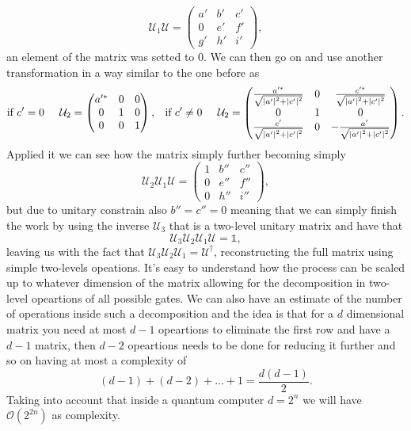 {\begin{equation}
        \mathcal{U}_1\mathcal{U} = \begin{pmatrix}
            a' & b' & c'\\
            0 & e' & f'\\
            g' & h' & i'
        \end{pmatrix},
    \end{equation}
    an element of the matrix was setted to $0$. We can then go on and use another transformation in a way similar to the one before as
    \begin{align}
        &\text{if }c'=0 \hspace{0.5cm}\mathcal{U}_2 = \begin{pmatrix}
            a'^* & 0 & 0\\
            0 & 1 & 0\\
            0 & 0 & 1
        \end{pmatrix}, &\text{if }c'\neq 0 \hspace{0.5cm}\mathcal{U}_2 =\begin{pmatrix}
            \frac{a'^*}{\sqrt{\abs{a'}^2 + \abs{c'}^2}} & 0 & \frac{c'^*}{\sqrt{\abs{a'}^2 + \abs{c'}^2}}\\
            0 & 1 & 0\\
            \frac{c'}{\sqrt{\abs{a'}^2 + \abs{c'}^2}} & 0 & -\frac{a'}{\sqrt{\abs{a'}^2 + \abs{c'}^2}}
        \end{pmatrix}.
    \end{align}
    Applied it we can see how the matrix simply further becoming simply
    \begin{equation}
        \mathcal{U}_2\mathcal{U}_1\mathcal{U} = \begin{pmatrix}
            1 & b'' & c''\\
            0 & e'' & f''\\
            0 & h'' & i''
        \end{pmatrix},
    \end{equation}
    but due to unitary constrain also $b'' = c'' = 0$ meaning that we can simply finish the work by using the inverse $\mathcal{U}_3$ that is a two-level unitary matrix and have that
    \begin{equation}
        \mathcal{U}_3\mathcal{U}_2\mathcal{U}_1\mathcal{U} = \mathbb{1},
    \end{equation}
    leaving us with the fact that $\mathcal{U}_3\mathcal{U}_2\mathcal{U}_1 = \mathcal{U}^\dagger$, reconstructing the full matrix using simple two-levels opeations. It's easy to understand how the process can be scaled up to whatever dimension of the matrix allowing for the decomposition in two-level opeartions of all possible gates. We can also have an estimate of the number of operations inside such a decomposition and the idea is that for a $d$ dimensional matrix you need at most $d-1$ opeartions to eliminate the first row and have a $d-1$ matrix, then $d-2$ opeartions needs to be done for reducing it further and so on having at most a complexity of
    \begin{equation}
        (d-1) + (d-2) + \dots + 1 = \frac{d(d-1)}{2}.
    \end{equation}
    Taking into account that inside a quantum computer $d = 2^n$ we will have $\mathcal{O}(2^{2n})$ as complexity. 
}
